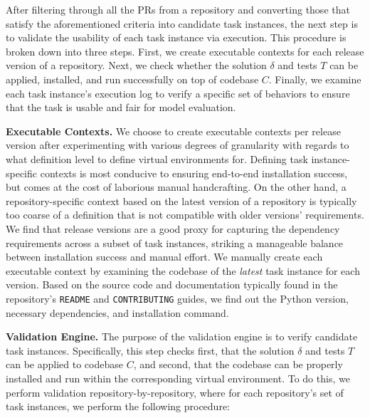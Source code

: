 After filtering through all the PRs from a repository and converting those that satisfy the aforementioned criteria into candidate task instances, the next step is to validate the usability of each task instance via execution.
This procedure is broken down into three steps.
First, we create executable contexts for each release version of a repository.
Next, we check whether the solution $\delta$ and tests $T$ can be applied, installed, and run successfully on top of codebase $C$.
Finally, we examine each task instance's execution log to verify a specific set of behaviors to ensure that the task is usable and fair for model evaluation.

\textbf{Executable Contexts.} We choose to create executable contexts per release version after experimenting with various degrees of granularity with regards to what definition level to define virtual environments for. 
Defining task instance-specific contexts is most conducive to ensuring end-to-end installation success, but comes at the cost of laborious manual handcrafting.
On the other hand, a repository-specific context based on the latest version of a repository is typically too coarse of a definition that is not compatible with older versions' requirements.
We find that release versions are a good proxy for capturing the dependency requirements across a subset of task instances, striking a manageable balance between installation success and manual effort.
We manually create each executable context by examining the codebase of the \textit{latest} task instance for each version.
Based on the source code and documentation typically found in the repository's \texttt{README} and \texttt{CONTRIBUTING} guides, we find out the Python version, necessary dependencies, and installation command.

\textbf{Validation Engine.}
The purpose of the validation engine is to verify candidate task instances. Specifically, this step checks first, that the solution $\delta$ and tests $T$ can be applied to codebase $C$, and second, that the codebase can be properly installed and run within the corresponding virtual environment.
To do this, we perform validation repository-by-repository, where for each repository's set of task instances, we perform the following procedure:

